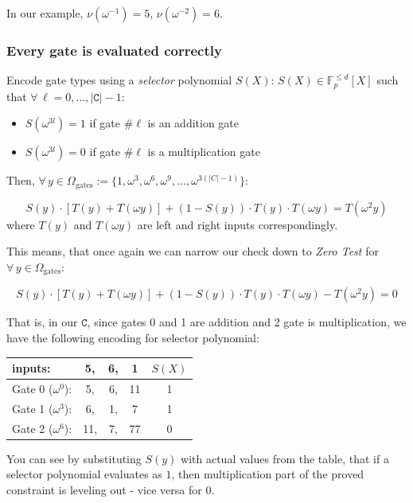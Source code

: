 \documentclass[../lecture-notes.tex]{subfiles}
\begin{document}
\begin{example}
In our example, \(\nu(\omega^{-1})=5\), \(\nu(\omega^{-2})=6\).
\end{example}

\subsubsection{Every gate is evaluated correctly}

Encode gate types using a \textit{selector} polynomial \(S(X)\):
\(S(X) \in \mathbb{F}_p^{\leq d}[X]\) such that \(\forall \, \ell = 0, ..., |\texttt{C}| - 1\): 
\begin{itemize}
    \item \(S(\omega^{3l}) = 1\) if gate \(\# \ell\) is an addition gate 
    \item \(S(\omega^{3l}) = 0\) if gate \(\# \ell\) is a multiplication gate 
\end{itemize}

Then, \(\forall \, y \in \Omega_{\text{gates}} := \{ 1, \omega^3, \omega^6, \omega^9, ..., \omega^{3(|C|-1)} \}\):

\[S(y) \cdot [T(y) + T(\omega y)] + (1 - S(y)) \cdot T(y) \cdot T(\omega y) = T(\omega^2 y)\]
where \(T(y)\) and \(T(\omega y)\) are left and right inputs correspondingly.

This means, that once again we can narrow our check down to \textit{Zero Test} for \(\forall \, y \in \Omega_{\text{gates}}\):

\[S(y) \cdot [T(y) + T(\omega y)] + (1 - S(y)) \cdot T(y) \cdot T(\omega y) - T(\omega^2 y) = 0\]

\begin{example}

That is, in our \(\texttt{C}\), since gates 0 and 1 are addition and 2 gate is multiplication, we have the following encoding for selector polynomial:

\begin{center}
\begin{tabular}{l ccc | c}
  inputs: & 5, & 6, & 1 & $S(X)$ \\ \hline
  Gate 0 ($\omega^0$): & 5, & 6, & 11 & 1 \\
  Gate 1 ($\omega^3$): & 6, & 1, & 7 & 1 \\
  Gate 2 ($\omega^6$): & 11, & 7, & 77 & 0 \\ 
\end{tabular}
\end{center}

You can see by substituting \(S(y)\) with actual values from the table, that if a selector polynomial evaluates as \(1\), then multiplication part of the proved constraint is leveling out - vice versa for \(0\).

\end{example}
\end{document}
